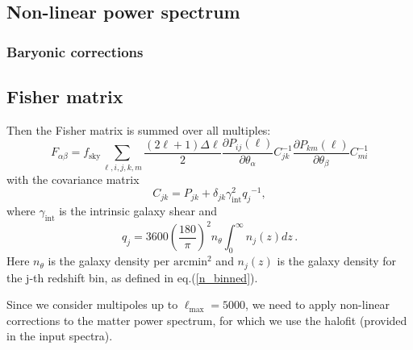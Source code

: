 \subsection{Non-linear power spectrum}


\subsubsection{Baryonic corrections}


\subsection{Fisher matrix}

Then the Fisher matrix is summed over all multiples:
\begin{equation}
F_{\alpha\beta}=f_{\mathrm{sky}}\sum\limits _{\ell,i,j,k,m}\frac{(2\ell+1)\Delta\ell}{2}\frac{\partial P_{ij}(\ell)}{\partial\theta_{\alpha}}C_{jk}^{-1}\frac{\partial P_{km}(\ell)}{\partial\theta_{\beta}}C_{mi}^{-1}\label{eq:fm-wl}
\end{equation}
 with the covariance matrix 
\begin{equation}
C_{jk}=P_{jk}+\delta_{jk}\gamma_{\mathrm{int}}^{2}{{{q}}_j}^{-1},
\end{equation}
 where $\gamma_{\mathrm{int}}$ is the
intrinsic galaxy shear  and 
\begin{equation}
q_{j} = 3600\left(\frac{180}{\pi}\right)^{2} n_{\theta} \int^\infty_0 n_j(z) dz \, .
\end{equation}
Here $n_{\theta}$ is the galaxy density per $\mathrm{arcmin}^{2}$ and $n_j(z)$ is the galaxy density for the j-th redshift bin, as defined in eq.(\ref{n_binned}).

Since we consider multipoles up to $\ell_{\mathrm{max}}=5000$,
we need to apply non-linear corrections to the matter power spectrum,
for which we use the halofit (provided in the input spectra).

